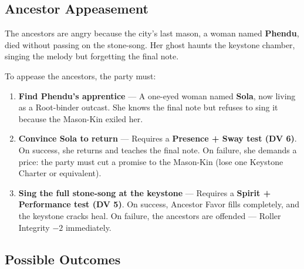 \begin{tcolorbox}[colback=black!3,colframe=green!60!black,title={The Nine Rollers: A City on the Edge},breakable]
  \vspace{2mm}
  \subsection*{Ancestor Appeasement}
  
  The ancestors are angry because the city's last mason, a woman named \textbf{Phendu}, died without passing on the stone-song. Her ghost haunts the keystone chamber, singing the melody but forgetting the final note.
  
  To appease the ancestors, the party must:
  \begin{enumerate}
  \item \textbf{Find Phendu's apprentice} --- A one-eyed woman named \textbf{Sola}, now living as a Root-binder outcast. She knows the final note but refuses to sing it because the Mason-Kin exiled her.
  \item \textbf{Convince Sola to return} --- Requires a \textbf{Presence + Sway test (DV 6)}. On success, she returns and teaches the final note. On failure, she demands a price: the party must cut a promise to the Mason-Kin (lose one Keystone Charter or equivalent).
  \item \textbf{Sing the full stone-song at the keystone} --- Requires a \textbf{Spirit + Performance test (DV 5)}. On success, Ancestor Favor fills completely, and the keystone cracks heal. On failure, the ancestors are offended --- Roller Integrity $-2$ immediately.
  \end{enumerate}
  
  \vspace{2mm}
  \subsection*{Possible Outcomes}
  

\end{tcolorbox}
